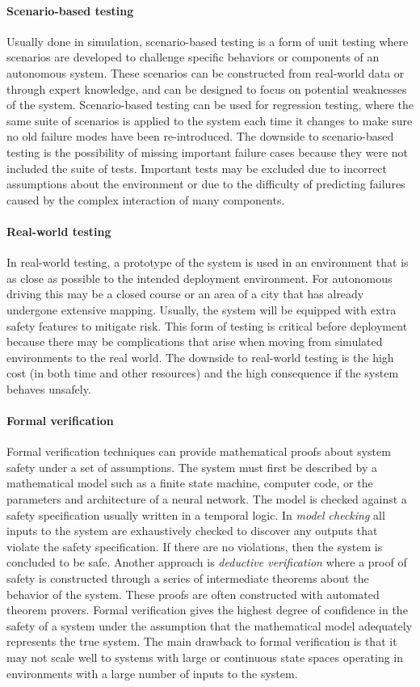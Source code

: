 \paragraph{Scenario-based testing} Usually done in simulation, scenario-based testing is a form of unit testing where scenarios are developed to challenge specific behaviors or components of an autonomous system. These scenarios can be constructed from real-world data or through expert knowledge, and can be designed to focus on potential weaknesses of the system. Scenario-based testing can be used for regression testing, where the same suite of scenarios is applied to the system each time it changes to make sure no old failure modes have been re-introduced. The downside to scenario-based testing is the possibility of missing important failure cases because they were not included the suite of tests. Important tests may be excluded due to incorrect assumptions about the environment or due to the difficulty of predicting failures caused by the complex interaction of many components.

\paragraph{Real-world testing} In real-world testing, a prototype of the system is used in an environment that is as close as possible to the intended deployment environment. For autonomous driving this may be a closed course or an area of a city that has already undergone extensive mapping. Usually, the system will be equipped with extra safety features to mitigate risk. This form of testing is critical before deployment because there may be complications that arise when moving from simulated environments to the real world. The downside to real-world testing is the high cost (in both time and other resources) and the high consequence if the system behaves unsafely.

\paragraph{Formal verification} Formal verification techniques can provide mathematical proofs about system safety under a set of assumptions. The system must first be described by a mathematical model such as a finite state machine, computer code, or the parameters and architecture of a neural network. The model is checked against a safety specification usually written in a temporal logic. In \emph{model checking} all inputs to the system are exhaustively checked to discover any outputs that violate the safety specification. If there are no violations, then the system is concluded to be safe. Another approach is \emph{deductive verification} where a proof of safety is constructed through a series of intermediate theorems about the behavior of the system. These proofs are often constructed with automated theorem provers. Formal verification gives the highest degree of confidence in the safety of a system under the assumption that the mathematical model adequately represents the true system. The main drawback to formal verification is that it may not scale well to systems with large or continuous state spaces operating in environments with a large number of inputs to the system. 

